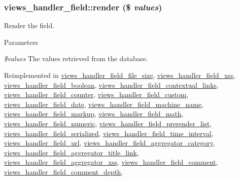 {\subsubsection[{render}]{\setlength{\rightskip}{0pt plus 5cm}views\_\-handler\_\-field::render (\$ {\em values})}}
\label{classviews__handler__field_a82ff951c5e9ceb97b2eab86f880cbc1e}
Render the field.


\begin{DoxyParams}{Parameters}
\item[{\em \$values}]The values retrieved from the database. \end{DoxyParams}


Reimplemented in \hyperlink{classviews__handler__field__file__size_a9ceb28e958ee939634f1c91e28b8579c}{views\_\-handler\_\-field\_\-file\_\-size}, \hyperlink{classviews__handler__field__xss_afbfbc9ee1d2927e22cd5385c5f2fa918}{views\_\-handler\_\-field\_\-xss}, \hyperlink{classviews__handler__field__boolean_ad7d7fc1b29362cee6b2f043e029052af}{views\_\-handler\_\-field\_\-boolean}, \hyperlink{classviews__handler__field__contextual__links_a846ef1ba2d278ef6a251bc7fbfa150cb}{views\_\-handler\_\-field\_\-contextual\_\-links}, \hyperlink{classviews__handler__field__counter_af046da8114cbb0ddcc888a305a1676e2}{views\_\-handler\_\-field\_\-counter}, \hyperlink{classviews__handler__field__custom_a0498d3ad0dff40c9e49ec599363c2157}{views\_\-handler\_\-field\_\-custom}, \hyperlink{classviews__handler__field__date_a4ed821df9270dc90bd3c2103d7136d47}{views\_\-handler\_\-field\_\-date}, \hyperlink{classviews__handler__field__machine__name_aa825279a03869f72671e453f5f75dfde}{views\_\-handler\_\-field\_\-machine\_\-name}, \hyperlink{classviews__handler__field__markup_a7a6eb0c91f30643eb29d19dcc76b23d3}{views\_\-handler\_\-field\_\-markup}, \hyperlink{classviews__handler__field__math_a2d3ecd4f87873d06e47f9debabd78801}{views\_\-handler\_\-field\_\-math}, \hyperlink{classviews__handler__field__numeric_a9c76aeef951c45385fd91a22e5e656aa}{views\_\-handler\_\-field\_\-numeric}, \hyperlink{classviews__handler__field__prerender__list_ae29a9fc47e5a83e9a8eb314dc46e68cf}{views\_\-handler\_\-field\_\-prerender\_\-list}, \hyperlink{classviews__handler__field__serialized_ad1ab783ff282f7d3af5e93e6debbc176}{views\_\-handler\_\-field\_\-serialized}, \hyperlink{classviews__handler__field__time__interval_aac98a5a54ec9f24cc730f114d2067524}{views\_\-handler\_\-field\_\-time\_\-interval}, \hyperlink{classviews__handler__field__url_a6f96c8adfdd1892619793359448e70ad}{views\_\-handler\_\-field\_\-url}, \hyperlink{classviews__handler__field__aggregator__category_a7e4b0ebcef6f6f5b37480eb15eb378f0}{views\_\-handler\_\-field\_\-aggregator\_\-category}, \hyperlink{classviews__handler__field__aggregator__title__link_a1b3d319f7a95e1885726a975f1755b9f}{views\_\-handler\_\-field\_\-aggregator\_\-title\_\-link}, \hyperlink{classviews__handler__field__aggregator__xss_a0fb26b1adf6486a82441a2307971874e}{views\_\-handler\_\-field\_\-aggregator\_\-xss}, \hyperlink{classviews__handler__field__comment_ac5e0fecfcd448920e3d837c1daed59fa}{views\_\-handler\_\-field\_\-comment}, \hyperlink{classviews__handler__field__comment__depth_a02940dec9e78bd8e054f4c1b0f3159a9}{views\_\-handler\_\-field\_\-comment\_\-depth}, 